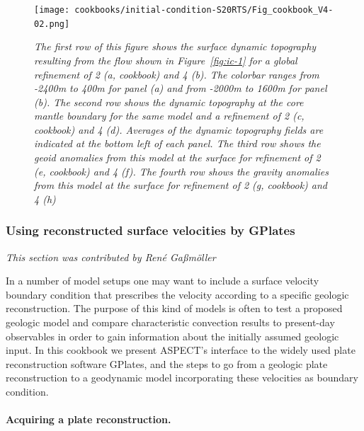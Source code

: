 \documentclass{article}
\newcommand{\aspect}{\textsc{ASPECT}}
\begin{document}
\begin{figure}
  \texttt{[image: cookbooks/initial-condition-S20RTS/Fig\_cookbook\_V4-02.png]}
  \hfill
  \caption{\it The first row of this figure shows the surface dynamic topography resulting 
  from the flow shown in Figure~\ref{fig:ic-1} for a global 
  refinement of 2 (a, cookbook) and 4 (b). The colorbar ranges from -2400m to 400m for panel (a) and
  from -2000m to 1600m for panel (b). The second row shows the dynamic topography at
  the core mantle boundary for the same model and a refinement of 2 (c, cookbook) and 4 (d). Averages of the 
  dynamic topography fields are indicated at the bottom left of each panel. The third row shows the
  geoid anomalies from this model at the surface for refinement of 2 (e, cookbook) and 4 (f). 
  The fourth row shows the gravity anomalies from this model at the surface for refinement of 2 
  (g, cookbook) and 4 (h)}
  \label{fig:ic-2}
\end{figure}

\subsubsection{Using reconstructed surface velocities by GPlates}
\label{sec:cookbooks-gplates}
\textit{This section was contributed by Ren{\'e} Ga{\ss}m{\"o}ller}

In a number of model setups one may want to include a surface velocity boundary
condition that prescribes the velocity according to a specific geologic
reconstruction. The purpose of this kind of models is often to test a proposed
geologic model and compare characteristic convection results to present-day
observables in order to gain information about the initially assumed geologic
input. In this cookbook we present \aspect{}'s interface to the  widely used
plate reconstruction software GPlates, and the steps to go from a geologic plate
reconstruction to a geodynamic model incorporating these velocities as boundary
condition.

\paragraph{Acquiring a plate reconstruction.}
\end{document}

